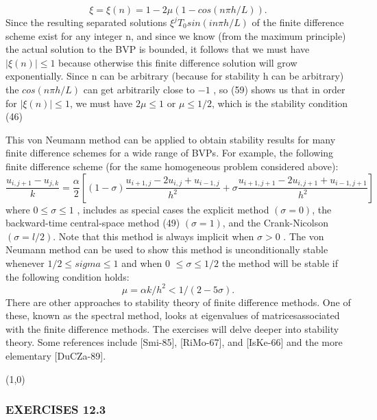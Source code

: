 \documentclass[../main.tex]{subfiles}
\begin{document}
\begin{equation}\label{eqa60}
\xi = \xi(n)=1-2\mu (1-cos(n\pi h/L)).
\end{equation}
Since the resulting separated solutions $\xi^j T_0 sin(in\pi h/L)$ of the finite difference scheme exist for any integer n, and since we know (from the maximum principle) the actual solution to the BVP is bounded, it follows that we must have $| \xi(n)| \leqslant 1$ because otherwise this finite difference solution will grow exponentially. Since n can be arbitrary (because for stability h can be arbitrary) the $cos(n\pi h/L)$ can get arbitrarily close to $-1$ , so (59) shows us that in order for $| \xi(n) | \leqslant 1$, we must have $2\mu \leqslant 1 $ or $\mu \leqslant 1 / 2$, which is the stability condition (46)


This von Neumann method can be applied to obtain stability results for many finite difference schemes for a wide range of BVPs. For example, the following finite difference scheme (for the same homogeneous problem considered above):
\begin{equation}\label{eqa61}
\dfrac{u_{i,j+1}-u_{j,k}}{k}=\dfrac{\alpha}{2}[(1-\sigma)\dfrac{u_{i+1,j}-2u_{i,j}+u_{i-1,j}}{h^2}+
\sigma\dfrac{u_{i+1,j+1}-2u_{i,j+1}+u_{i-1,j+1}}{h^2}]
\end{equation}
where $0 \leqslant \sigma \leqslant 1$ , includes as special cases the explicit method $(\sigma = 0)$, the backward-time central-space method (49) $( \sigma= 1)$, and the Crank-Nicolson  $( \sigma= l/2)$. Note that this method is always implicit when $\sigma> 0$ . The von Neumann method can be used to show this method is unconditionally stable whenever $1/2\leqslant sigma \leqslant 1$ and when 0 $\leqslant \sigma \leqslant 1/ 2$ the method will be stable if the following condition holds:
\begin{equation}\label{eqa62}
\mu=\alpha k/h^2 <1/(2-5\sigma).
\end{equation}
There are other approaches to stability theory of finite difference methods. One of these, known as the spectral method, looks at eigenvalues of matricesassociated with the finite difference methods. The exercises will delve deeper into stability theory. Some references include [Smi-85], [RiMo-67], and [IsKe-66] and the more elementary [DuCZa-89].

\line(1,0){\textwidth}
\subsubsection{EXERCISES 12.3 }
\end{document}
